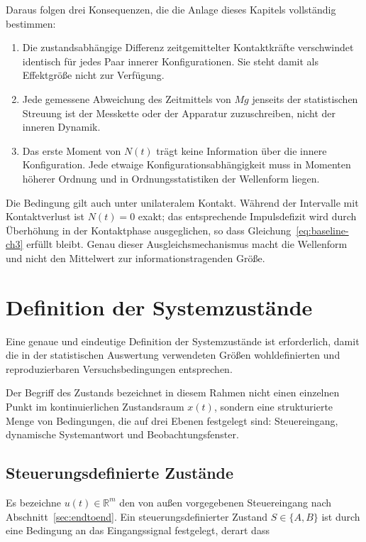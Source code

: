\documentclass[12pt,a4paper]{report}
\begin{document}
Daraus folgen drei Konsequenzen, die die Anlage dieses Kapitels
vollständig bestimmen:

\begin{enumerate}
  \item Die zustandsabhängige Differenz zeitgemittelter Kontaktkräfte
        verschwindet identisch für jedes Paar innerer Konfigurationen.
        Sie steht damit als Effektgröße nicht zur Verfügung.
  \item Jede gemessene Abweichung des Zeitmittels von $Mg$ jenseits der
        statistischen Streuung ist der Messkette oder der Apparatur
        zuzuschreiben, nicht der inneren Dynamik.
  \item Das erste Moment von $N(t)$ trägt keine Information über die
        innere Konfiguration. Jede etwaige Konfigurationsabhängigkeit
        muss in Momenten höherer Ordnung und in Ordnungsstatistiken der
        Wellenform liegen.
\end{enumerate}

Die Bedingung gilt auch unter unilateralem Kontakt. Während der
Intervalle mit Kontaktverlust ist $N(t) = 0$ exakt; das entsprechende
Impulsdefizit wird durch Überhöhung in der Kontaktphase ausgeglichen, so
dass Gleichung~\eqref{eq:baseline-ch3} erfüllt bleibt. Genau dieser
Ausgleichsmechanismus macht die Wellenform und nicht den Mittelwert zur
informationstragenden Größe.

\section{Definition der Systemzustände}

Eine genaue und eindeutige Definition der Systemzustände ist erforderlich,
damit die in der statistischen Auswertung verwendeten Größen
wohldefinierten und reproduzierbaren Versuchsbedingungen entsprechen.

Der Begriff des Zustands bezeichnet in diesem Rahmen nicht einen einzelnen
Punkt im kontinuierlichen Zustandsraum $x(t)$, sondern eine strukturierte
Menge von Bedingungen, die auf drei Ebenen festgelegt sind: Steuereingang,
dynamische Systemantwort und Beobachtungsfenster.

\subsection{Steuerungsdefinierte Zustände}

Es bezeichne $u(t) \in \mathbb{R}^{m}$ den von außen vorgegebenen
Steuereingang nach Abschnitt~\ref{sec:endtoend}. Ein steuerungsdefinierter
Zustand $S \in \{A, B\}$ ist durch eine Bedingung an das Eingangssignal
festgelegt, derart dass
\end{document}
